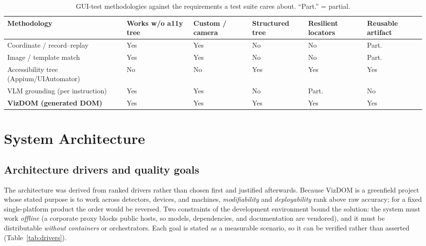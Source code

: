 \documentclass[11pt,a4paper]{article}
\begin{document}
\begin{table}[H]
  \centering\footnotesize
  \caption{GUI-test methodologies against the requirements a test suite cares about.
  ``Part.'' = partial.}
  \label{tab:methods}
  \begin{tabular}{@{}p{3.0cm}p{1.7cm}p{1.6cm}p{1.6cm}p{1.6cm}p{1.5cm}@{}}
    \toprule
    Methodology & Works w/o a11y tree & Custom / camera & Structured tree & Resilient locators & Reusable artifact \\
    \midrule
    Coordinate / record--replay & Yes & Yes & No & No & Part. \\
    Image / template match & Yes & Yes & No & No & Part. \\
    Accessibility tree (Appium/UIAutomator) & No & No & Yes & Yes & Yes \\
    VLM grounding (per instruction) & Yes & Yes & No & Part. & No \\
    \textbf{VizDOM (generated DOM)} & Yes & Yes & Yes & Yes & Yes \\
    \bottomrule
  \end{tabular}
\end{table}

\section{System Architecture}
\label{sec:arch}

\subsection{Architecture drivers and quality goals}
\label{sec:drivers}
The architecture was derived from ranked drivers rather than chosen first and
justified afterwards. Because VizDOM is a greenfield project whose stated purpose
is to work across detectors, devices, and machines, \emph{modifiability} and
\emph{deployability} rank above raw accuracy; for a fixed single-platform product
the order would be reversed. Two constraints of the development environment bound
the solution: the system must work \emph{offline} (a corporate proxy blocks public
hosts, so models, dependencies, and documentation are vendored), and it must be
distributable \emph{without containers} or orchestrators. Each goal is stated as a
measurable scenario, so it can be verified rather than asserted
(Table~\ref{tab:drivers}).
\end{document}
